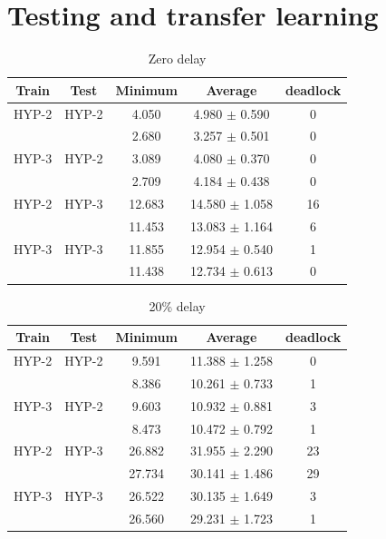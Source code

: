 \section{Testing and transfer learning}

\begin{table}
\centering
\caption{Zero delay}    
    \begin{tabular}{ |c|c|c|c|c| } 
     \hline
     Train & Test & Minimum & Average & deadlock \\ 
     \hline
     HYP-2 & HYP-2 & 4.050 & 4.980 $\pm$ 0.590 & 0 \\
     & & 2.680 & 3.257 $\pm$ 0.501 & 0 \\
     \hline
     
     HYP-3 & HYP-2 & 3.089 & 4.080 $\pm$ 0.370 & 0 \\
     & & 2.709 & 4.184 $\pm$ 0.438 & 0 \\
     \hline

     HYP-2 & HYP-3 & 12.683 & 14.580 $\pm$ 1.058 & 16 \\
     & & 11.453 & 13.083 $\pm$ 1.164 & 6 \\
     \hline

     HYP-3 & HYP-3 & 11.855 & 12.954 $\pm$ 0.540 & 1 \\
     & & 11.438 & 12.734 $\pm$ 0.613 & 0 \\
     \hline
    \end{tabular}
\end{table}


\begin{table}
    \centering
    \caption{20\% delay}    
        \begin{tabular}{ |c|c|c|c|c| } 
         \hline
         Train & Test & Minimum & Average & deadlock \\ 
         \hline
         HYP-2 & HYP-2 & 9.591 & 11.388 $\pm$ 1.258 & 0 \\
         & & 8.386 & 10.261 $\pm$ 0.733 & 1 \\
         \hline
         
         HYP-3 & HYP-2 & 9.603 & 10.932 $\pm$ 0.881 & 3 \\
         & & 8.473 & 10.472 $\pm$ 0.792 & 1 \\
         \hline
    
         HYP-2 & HYP-3 & 26.882 & 31.955 $\pm$ 2.290 & 23 \\
         & & 27.734 & 30.141 $\pm$ 1.486 & 29 \\
         \hline
    
         HYP-3 & HYP-3 & 26.522 & 30.135 $\pm$ 1.649 & 3 \\
         & & 26.560 & 29.231 $\pm$ 1.723 & 1 \\
         \hline
        \end{tabular}
\end{table}